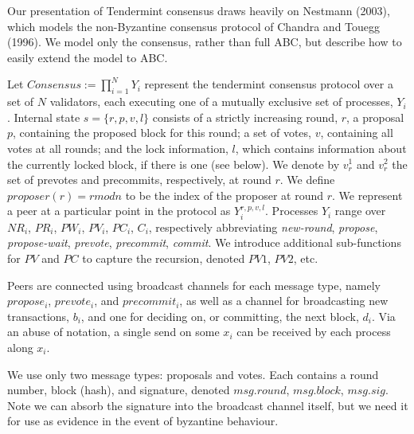 \documentclass[12pt]{report}
\renewcommand{\|}{\;|\;}
\begin{document}
Our presentation of Tendermint consensus draws heavily on Nestmann (2003),
which models the non-Byzantine consensus protocol of Chandra and Touegg (1996).
We model only the consensus, rather than full ABC, but describe how to 
easily extend the model to ABC.

Let $Consensus := \prod_{i=1}^N Y_i $ represent the tendermint consensus protocol
over a set of $N$ validators, each executing one of a mutually exclusive set of processes, $Y_i$.
Internal state $s = \{r, p, v, l\}$ consists of a strictly increasing round, $r$,
a proposal $p$, containing the proposed block for this round;
a set of votes, $v$, containing all votes at all rounds;
and the lock information, $l$, which contains information about the currently locked block, if there is one (see below).
We denote by $v_r^1$ and $v_r^2$ the set of prevotes and precommits, respectively, at round $r$.
We define $proposer(r) = r mod n$ to be the index of the proposer at round $r$.
We represent a peer at a particular point in the protocol as $Y_i^{r, p, v, l}$.
Processes $Y_i$ range over $NR_i$, $PR_i$, $PW_i$, $PV_i$, $PC_i$, $C_i$,
respectively abbreviating 
\emph{new-round}, \emph{propose}, \emph{propose-wait}, \emph{prevote}, \emph{precommit}, \emph{commit}.
We introduce additional sub-functions for $PV$ and $PC$ to capture the recursion,
denoted $PV1$, $PV2$, etc.

Peers are connected using broadcast channels for each message type,
namely $propose_i$, $prevote_i$, and $precommit_i$,
as well as a channel for broadcasting new transactions, $b_i$,
and one for deciding on, or committing, the next block, $d_i$.
Via an abuse of notation, a single send on some $x_i$ can be received by each process along
$x_i$.

We use only two message types: proposals and votes. 
Each contains a round number, block (hash), and signature, 
denoted $msg.round$, $msg.block$, $msg.sig$.
Note we can absorb the signature into the broadcast channel itself,
but we need it for use as evidence in the event of byzantine behaviour.
\end{document}
